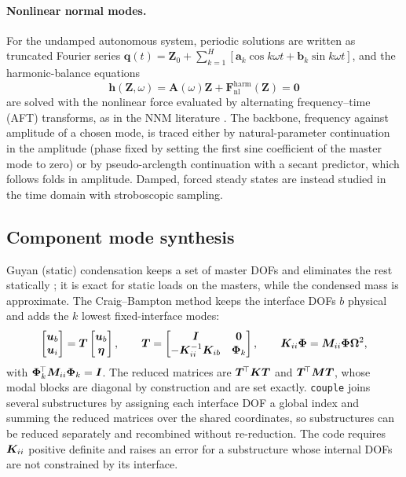 \paragraph{Nonlinear normal modes.}
For the undamped autonomous system, periodic solutions are written as truncated Fourier series $\bm q(t)=\bm Z_0+\sum_{k=1}^{H}[\bm a_k\cos k\omega t+\bm b_k\sin k\omega t]$, and the harmonic-balance equations
\begin{equation}
  \bm h(\bm Z,\omega)=\bm A(\omega)\bm Z+\bm F_{\mathrm{nl}}^{\mathrm{harm}}(\bm Z)=\bm 0
  \label{eq:hbm}
\end{equation}
are solved with the nonlinear force evaluated by alternating frequency--time (AFT) transforms, as in the NNM literature \cite{kerschen2009nnm}. The backbone, frequency against amplitude of a chosen mode, is traced either by natural-parameter continuation in the amplitude (phase fixed by setting the first sine coefficient of the master mode to zero)
or by pseudo-arclength continuation \cite{keller1977} with a secant predictor, which follows folds in amplitude. Damped, forced steady states are instead studied in the time domain with stroboscopic sampling.

\subsection{Component mode synthesis}\label{sec:rom:cms}
Guyan (static) condensation keeps a set of master DOFs and eliminates the rest statically \cite{guyan1965}; it is exact for static loads on the masters, while the condensed mass is approximate. The Craig--Bampton method \cite{craig1968} keeps the interface DOFs $b$ physical and adds the $k$ lowest fixed-interface modes:
\begin{equation}
  \begin{bmatrix}\bm{u}_b\\ \bm{u}_i\end{bmatrix}=\bm T\begin{bmatrix}\bm{u}_b\\ \bm\eta\end{bmatrix},\qquad
  \bm T=\begin{bmatrix}\bm I&\bm 0\\ -\bm{K}_{ii}^{-1}\bm{K}_{ib}&\bm\Phi_k\end{bmatrix},\qquad
  \bm{K}_{ii}\bm\Phi=\bm{M}_{ii}\bm\Phi\bm\Omega^2,
  \label{eq:cb}
\end{equation}
with $\bm\Phi_k^{\!\top}\bm{M}_{ii}\bm\Phi_k=\bm I$. The reduced matrices are $\bm T^{\!\top}\bm{K}\bm T$ and $\bm T^{\!\top}\bm{M}\bm T$, whose modal blocks are diagonal by construction and are set exactly. \texttt{couple} joins several substructures by assigning each interface DOF a global index and summing the reduced matrices over the shared coordinates, so substructures can be reduced separately and recombined without re-reduction.
The code requires $\bm{K}_{ii}$ positive definite and raises an error for a substructure whose internal DOFs are not constrained by its interface.

